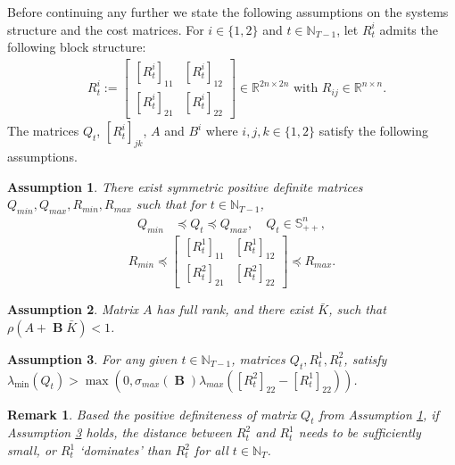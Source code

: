 \documentclass[letterpaper, 10 pt, conference]{ieeeconf}  %
\DeclareMathOperator{\contB}{\mathbf{B}}
\newtheorem{assumption}{Assumption}
\newtheorem{remark}{Remark}
\begin{document}
Before continuing any further we state the following assumptions on the systems structure and the cost matrices. For $i\in\{1,2\}$ and $t \in \mathbb{N}_{T-1}$, let $R_{t}^{i}$ admits the following block structure:
    \begin{align}
   &R_{t}^{i} := 
   \begin{bmatrix}
       [R_{t}^{i}]_{11} & [R_{t}^{i}]_{12}\\
       [R_{t}^{i}]_{21} & [R_{t}^{i}]_{22}
   \end{bmatrix}\in \mathbb{R}^{2n\times 2n}\text{ with }R_{ij}\in \mathbb{R}^{n\times n}.
   \end{align}
The matrices $Q_{t}$, $[R_{t}^{i}]_{jk}$, $A$ and $B^{i}$ where $i,j,k \in \{1,2\}$ satisfy the following assumptions.
\begin{assumption}\label{assumption:bounds}
    There exist symmetric positive definite matrices $Q_{min}, Q_{max}, R_{min}, R_{max}$ such that
    for $ t \in \mathbb{N}_{T-1}$,
    \begin{align*}
        Q_{min} &\preceq Q_{t} \preceq Q_{max}, \quad Q_{t} \in \mathbb{S}^{n}_{++},
    \end{align*}
    \begin{equation}\label{eq:positiveR}
        R_{min} \preceq 
        \begin{bmatrix}
            [R_{t}^{1}]_{11} & [R_{t}^{1}]_{12}\\
            [R_{t}^{2}]_{21} & [R_{t}^{2}]_{22}
        \end{bmatrix}
        \preceq R_{max}.
    \end{equation}
\end{assumption}
\begin{assumption}\label{assumption:controllable}
    Matrix $A$ has full rank, and there exist $\bar{K}$, such that $\rho(A + \contB \bar{K}) < 1$.
\end{assumption}
\begin{assumption}\label{assumption:lowerQ}
    For any given $t \in \mathbb{N}_{T-1}$, matrices $Q_{t}, R_{t}^{1}, R_{t}^{2}$,
    satisfy
        $\lambda_{\min}(Q_{t}) > \max(0,\sigma_{max}(\contB)\lambda_{max}([R_{t}^{2}]_{22} - [R_{t}^{1}]_{22}))$.
\end{assumption}
\begin{remark}
    Based the positive definiteness of matrix $Q_{t}$ from Assumption \ref{assumption:bounds}, if Assumption \ref{assumption:lowerQ} holds, the distance between $R_{t}^{2}$ and $R_{t}^{1}$ needs to be sufficiently small, or $R_{t}^{1}$ `dominates' than $R_{t}^{2}$ for all $t\in \mathbb{N}_{T}$.
\end{remark}
\end{document}
